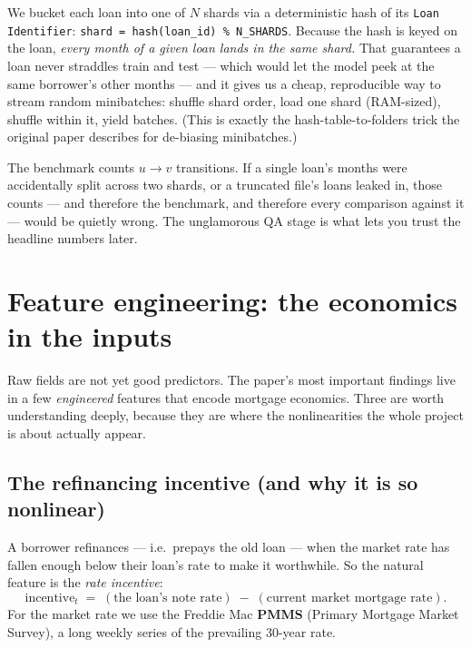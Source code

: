 \documentclass[11pt]{article}
\begin{document}
\begin{intuition}
We bucket each loan into one of $N$ shards via a deterministic hash of its
\texttt{Loan Identifier}: \texttt{shard = hash(loan\_id) \% N\_SHARDS}. Because the hash
is keyed on the loan, \emph{every month of a given loan lands in the same shard.} That
guarantees a loan never straddles train and test --- which would let the model peek at
the same borrower's other months --- and it gives us a cheap, reproducible way to stream
random minibatches: shuffle shard order, load one shard (RAM-sized), shuffle within it,
yield batches. (This is exactly the hash-table-to-folders trick the original paper
describes for de-biasing minibatches.)
\end{intuition}

\begin{derivation}
The benchmark counts $u\to v$ transitions. If a single loan's months were accidentally
split across two shards, or a truncated file's loans leaked in, those counts --- and
therefore the benchmark, and therefore every comparison against it --- would be quietly
wrong. The unglamorous QA stage is what lets you trust the headline numbers later.
\end{derivation}

\section{Feature engineering: the economics in the inputs}
\label{sec:features}

Raw fields are not yet good predictors. The paper's most important findings live in a few
\emph{engineered} features that encode mortgage economics. Three are worth understanding
deeply, because they are where the nonlinearities the whole project is about actually
appear.

\subsection{The refinancing incentive (and why it is so nonlinear)}

A borrower refinances --- i.e.\ prepays the old loan --- when the market rate has fallen
enough below their loan's rate to make it worthwhile. So the natural feature is the
\emph{rate incentive}:
\[
  \text{incentive}_t \;=\; (\text{the loan's note rate}) \;-\; (\text{current market mortgage rate}).
\]
For the market rate we use the Freddie Mac \textbf{PMMS} (Primary Mortgage Market Survey),
a long weekly series of the prevailing 30-year rate.
\end{document}
